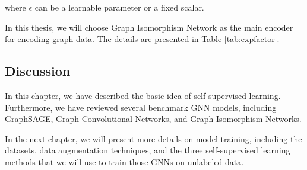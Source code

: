where $\epsilon$ can be a learnable parameter or a fixed scalar. 



In this thesis, we will choose Graph Isomorphism Network as the main encoder for encoding graph data. The details are presented in Table  \ref{tab:expfactor}.



\subsection{Discussion}


In this chapter, we have described the basic idea of self-supervised learning. Furthermore, we have reviewed several benchmark GNN models, including GraphSAGE, Graph Convolutional Networks, and Graph Isomorphism Networks. 

In the next chapter, we will present more details on model training, including the datasets, data augmentation techniques, and the three self-supervised learning methods that we will use to train those GNNs on unlabeled data.










